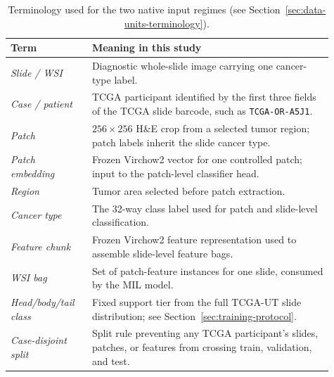 \documentclass[11pt]{article}
\begin{document}
\begin{table}[ht]
  \centering
  \small
  \begin{tabular}{p{0.23\linewidth}p{0.68\linewidth}}
    \toprule
    Term & Meaning in this study\\
    \midrule
    \emph{Slide / WSI} & Diagnostic whole-slide image carrying one cancer-type label.\\
    \emph{Case / patient} & TCGA participant identified by the first three fields of the TCGA slide barcode, such as \texttt{TCGA-OR-A5J1}.\\
    \emph{Patch} & $256\times256$ H\&E crop from a selected tumor region; patch labels inherit the slide cancer type.\\
    \emph{Patch embedding} & Frozen Virchow2 vector for one controlled patch; input to the patch-level classifier head.\\
    \emph{Region} & Tumor area selected before patch extraction.\\
    \emph{Cancer type} & The 32-way class label used for patch and slide-level classification.\\
    \emph{Feature chunk} & Frozen Virchow2 feature representation used to assemble slide-level feature bags.\\
    \emph{WSI bag} & Set of patch-feature instances for one slide, consumed by the MIL model.\\
    \emph{Head/body/tail class} & Fixed support tier from the full TCGA-UT slide distribution; see Section~\ref{sec:training-protocol}.\\
    \emph{Case-disjoint split} & Split rule preventing any TCGA participant's slides, patches, or features from crossing train, validation, and test.\\
    \bottomrule
  \end{tabular}
  \caption{Terminology used for the two native input regimes (see Section~\ref{sec:data-units-terminology}).}
  \label{tab:dataset-terminology}
\end{table}

\clearpage


\end{document}
